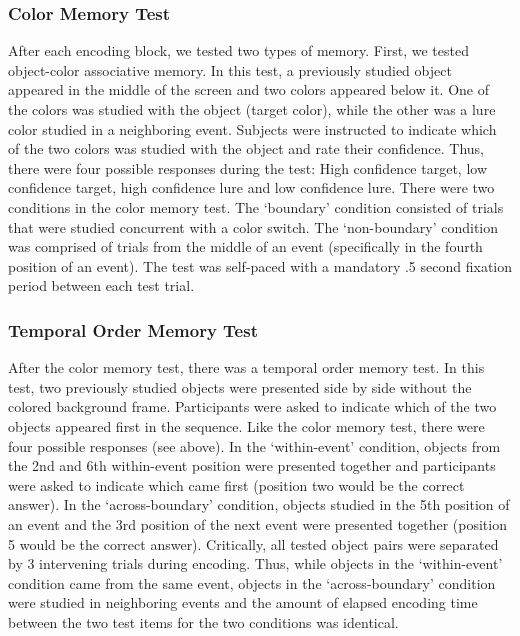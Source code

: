 \subsubsection{Color Memory Test}\label{color-memory-test}

After each encoding block, we tested two types of memory. First, we
tested object-color associative memory. In this test, a previously
studied object appeared in the middle of the screen and two colors
appeared below it. One of the colors was studied with the object (target
color), while the other was a lure color studied in a neighboring event.
Subjects were instructed to indicate which of the two colors was studied
with the object and rate their confidence. Thus, there were four
possible responses during the test: High confidence target, low
confidence target, high confidence lure and low confidence lure. There
were two conditions in the color memory test. The `boundary' condition
consisted of trials that were studied concurrent with a color switch.
The `non-boundary' condition was comprised of trials from the middle of
an event (specifically in the fourth position of an event). The test was
self-paced with a mandatory .5 second fixation period between each test
trial.

\subsubsection{Temporal Order Memory
Test}\label{temporal-order-memory-test}

After the color memory test, there was a temporal order memory test. In
this test, two previously studied objects were presented side by side
without the colored background frame. Participants were asked to
indicate which of the two objects appeared first in the sequence. Like
the color memory test, there were four possible responses (see above).
In the `within-event' condition, objects from the 2nd and 6th
within-event position were presented together and participants were
asked to indicate which came first (position two would be the correct
answer). In the `across-boundary' condition, objects studied in the 5th
position of an event and the 3rd position of the next event were
presented together (position 5 would be the correct answer). Critically,
all tested object pairs were separated by 3 intervening trials during
encoding. Thus, while objects in the `within-event' condition came from
the same event, objects in the `across-boundary' condition were studied
in neighboring events and the amount of elapsed encoding time between
the two test items for the two conditions was identical.

